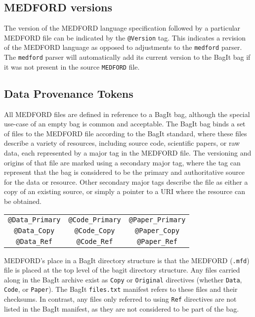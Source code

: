 \documentclass[10pt]{article}
\begin{document}
\subsection{MEDFORD versions}

The version of the MEDFORD language specification followed by a particular MEDFORD file can be indicated by the \texttt{@Version} tag. This indicates a revision of the MEDFORD language as opposed to adjustments to the \texttt{medford} parser. The \texttt{medford} parser will automatically add its current version to the BagIt bag if it was not present in the source \texttt{MEDFORD} file.
    
\subsection{Data Provenance Tokens}    

All MEDFORD files are defined in reference to a BagIt bag, although the special use-case of an empty bag is common and acceptable. The BagIt bag binds a set of files to the MEDFORD file according to the BagIt standard, where these files describe a variety of resources, including source code, scientific papers, or raw data, each represented by a major tag in the MEDFORD file. The versioning and origins of that file are marked using a secondary major tag, where the tag can represent that the bag is considered to be the primary and authoritative source for the data or resource. Other secondary major tags describe the file as either a copy of an existing source, or simply a pointer to a URI where the resource can be obtained.

\vspace{0.5cm}

{\small
\begin{tabular}{|c|c|c|} \hline
    \texttt{@Data\_Primary} & \texttt{@Code\_Primary} & \texttt{@Paper\_Primary} \\
    \texttt{@Data\_Copy} & \texttt{@Code\_Copy} & \texttt{@Paper\_Copy} \\
  \texttt{@Data\_Ref} & \texttt{@Code\_Ref} & \texttt{@Paper\_Ref} \\ \hline
  \end{tabular}
} 

\vspace{0.5cm}

MEDFORD's place in a BagIt directory structure is that the MEDFORD (\texttt{.mfd}) file is placed at the top level of the bagit directory structure. Any files carried along in the BagIt archive exist as \texttt{Copy} or \texttt{Original} directives (whether \texttt{Data}, \texttt{Code}, or \texttt{Paper}). The BagIt \texttt{files.txt} manifest refers to these files and their checksums. In contrast, any files only referred to using \texttt{Ref} directives are not listed in the BagIt manifest, as they are not considered to be part of the bag.
\end{document}
